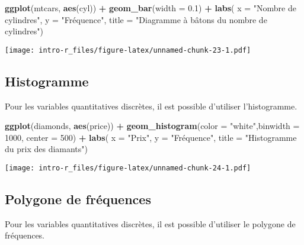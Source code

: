 \documentclass[]{book}
\newenvironment{Shaded}{\begin{snugshade}}{\end{snugshade}}
\newcommand{\KeywordTok}[1]{\textcolor[rgb]{0.13,0.29,0.53}{\textbf{#1}}}
\newcommand{\DataTypeTok}[1]{\textcolor[rgb]{0.13,0.29,0.53}{#1}}
\newcommand{\DecValTok}[1]{\textcolor[rgb]{0.00,0.00,0.81}{#1}}
\newcommand{\FloatTok}[1]{\textcolor[rgb]{0.00,0.00,0.81}{#1}}
\newcommand{\StringTok}[1]{\textcolor[rgb]{0.31,0.60,0.02}{#1}}
\newcommand{\OperatorTok}[1]{\textcolor[rgb]{0.81,0.36,0.00}{\textbf{#1}}}
\newcommand{\NormalTok}[1]{#1}
\begin{document}
\begin{Shaded}
\begin{Highlighting}[]
\KeywordTok{ggplot}\NormalTok{(mtcars, }\KeywordTok{aes}\NormalTok{(cyl)) }\OperatorTok{+}\StringTok{ }
\StringTok{  }\KeywordTok{geom_bar}\NormalTok{(}\DataTypeTok{width =} \FloatTok{0.1}\NormalTok{) }\OperatorTok{+}\StringTok{ }
\StringTok{  }\KeywordTok{labs}\NormalTok{(}
    \DataTypeTok{x =} \StringTok{"Nombre de cylindres"}\NormalTok{, }
    \DataTypeTok{y =} \StringTok{"Fréquence"}\NormalTok{, }
    \DataTypeTok{title =} \StringTok{"Diagramme à bâtons du nombre de cylindres"}\NormalTok{)}
\end{Highlighting}
\end{Shaded}

\texttt{[image: intro-r\_files/figure-latex/unnamed-chunk-23-1.pdf]}

\subsection{Histogramme}\label{histogramme}

Pour les variables quantitatives discrètes, il est possible d'utiliser
l'histogramme.

\begin{Shaded}
\begin{Highlighting}[]
\KeywordTok{ggplot}\NormalTok{(diamonds, }\KeywordTok{aes}\NormalTok{(price)) }\OperatorTok{+}\StringTok{ }
\StringTok{  }\KeywordTok{geom_histogram}\NormalTok{(}\DataTypeTok{color =} \StringTok{"white"}\NormalTok{,}\DataTypeTok{binwidth =} \DecValTok{1000}\NormalTok{, }\DataTypeTok{center =} \DecValTok{500}\NormalTok{) }\OperatorTok{+}
\StringTok{  }\KeywordTok{labs}\NormalTok{(}
    \DataTypeTok{x =} \StringTok{"Prix"}\NormalTok{, }
    \DataTypeTok{y =} \StringTok{"Fréquence"}\NormalTok{, }
    \DataTypeTok{title =} \StringTok{"Histogramme du prix des diamants"}\NormalTok{)}
\end{Highlighting}
\end{Shaded}

\texttt{[image: intro-r\_files/figure-latex/unnamed-chunk-24-1.pdf]}

\subsection{Polygone de fréquences}\label{polygone-de-frequences}

Pour les variables quantitatives discrètes, il est possible d'utiliser
le polygone de fréquences.
\end{document}
